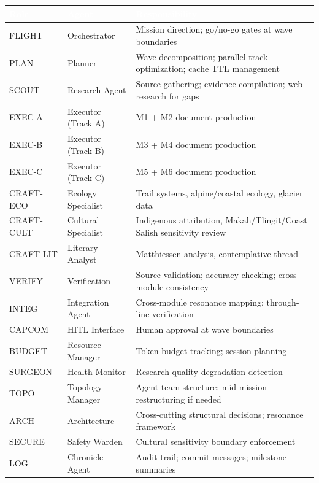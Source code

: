 \documentclass[11pt,letterpaper]{article}
\newcommand{\tableheader}[1]{\textbf{\sffamily\textcolor{white}{#1}}}
\begin{document}
\begin{center}
\begin{tabularx}{\textwidth}{L{2cm}L{2.5cm}X}
\toprule
{}
\tableheader{Role} & \tableheader{Agent} & \tableheader{Responsibility} \\
\midrule
FLIGHT & Orchestrator & Mission direction; go/no-go gates at wave boundaries \\
PLAN & Planner & Wave decomposition; parallel track optimization; cache TTL management \\
SCOUT & Research Agent & Source gathering; evidence compilation; web research for gaps \\
EXEC-A & Executor (Track A) & M1 + M2 document production \\
EXEC-B & Executor (Track B) & M3 + M4 document production \\
EXEC-C & Executor (Track C) & M5 + M6 document production \\
CRAFT-ECO & Ecology Specialist & Trail systems, alpine/coastal ecology, glacier data \\
CRAFT-CULT & Cultural Specialist & Indigenous attribution, Makah/Tlingit/Coast Salish sensitivity review \\
CRAFT-LIT & Literary Analyst & Matthiessen analysis, contemplative thread \\
VERIFY & Verification & Source validation; accuracy checking; cross-module consistency \\
INTEG & Integration Agent & Cross-module resonance mapping; through-line verification \\
CAPCOM & HITL Interface & Human approval at wave boundaries \\
BUDGET & Resource Manager & Token budget tracking; session planning \\
SURGEON & Health Monitor & Research quality degradation detection \\
TOPO & Topology Manager & Agent team structure; mid-mission restructuring if needed \\
ARCH & Architecture & Cross-cutting structural decisions; resonance framework \\
SECURE & Safety Warden & Cultural sensitivity boundary enforcement \\
LOG & Chronicle Agent & Audit trail; commit messages; milestone summaries \\
\bottomrule
\end{tabularx}
\end{center}
\end{document}
